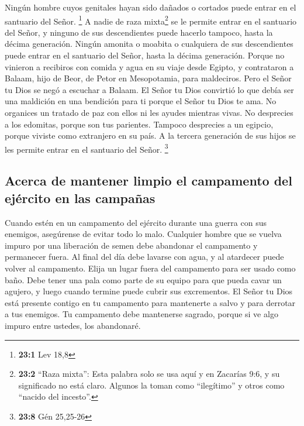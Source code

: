  Ningún hombre cuyos genitales hayan sido dañados o
cortados puede entrar en el santuario del Señor. \footnote{\textbf{23:1}
  Lev 18,8}  A nadie de raza mixta\footnote{\textbf{23:2}
  ``Raza mixta'': Esta palabra solo se usa aquí y en Zacarías 9:6, y su
  significado no está claro. Algunos la toman como ``ilegítimo'' y otros
  como ``nacido del incesto''.} se le permite entrar en el santuario del
Señor, y ninguno de sus descendientes puede hacerlo tampoco, hasta la
décima generación.  Ningún amonita o moabita o cualquiera
de sus descendientes puede entrar en el santuario del Señor, hasta la
décima generación.  Porque no vinieron a recibiros con
comida y agua en su viaje desde Egipto, y contrataron a Balaam, hijo de
Beor, de Petor en Mesopotamia, para maldeciros.  Pero el
Señor tu Dios se negó a escuchar a Balaam. El Señor tu Dios convirtió lo
que debía ser una maldición en una bendición para ti porque el Señor tu
Dios te ama.  No organices un tratado de paz con ellos ni
les ayudes mientras vivas.  No desprecies a los edomitas,
porque son tus parientes. Tampoco desprecies a un egipcio, porque
viviste como extranjero en su país.  A la tercera
generación de sus hijos se les permite entrar en el santuario del Señor.
\footnote{\textbf{23:8} Gén 25,25-26}

\hypertarget{acerca-de-mantener-limpio-el-campamento-del-ejuxe9rcito-en-las-campauxf1as}{%
\subsection{Acerca de mantener limpio el campamento del ejército en las
campañas}\label{acerca-de-mantener-limpio-el-campamento-del-ejuxe9rcito-en-las-campauxf1as}}

 Cuando estén en un campamento del ejército durante una
guerra con sus enemigos, asegúrense de evitar todo lo malo.
 Cualquier hombre que se vuelva impuro por una liberación
de semen debe abandonar el campamento y permanecer fuera.
 Al final del día debe lavarse con agua, y al atardecer
puede volver al campamento.  Elija un lugar fuera del
campamento para ser usado como baño.  Debe tener una pala
como parte de su equipo para que pueda cavar un agujero, y luego cuando
termine puede cubrir sus excrementos.  El Señor tu Dios
está presente contigo en tu campamento para mantenerte a salvo y para
derrotar a tus enemigos. Tu campamento debe mantenerse sagrado, porque
si ve algo impuro entre ustedes, los abandonaré.

